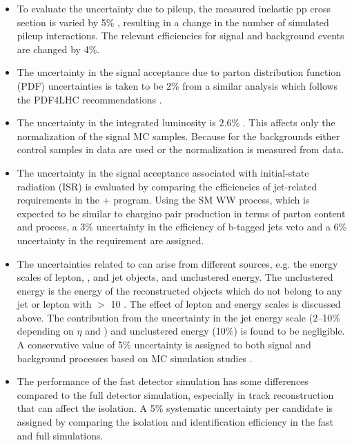 \begin{itemize}
\item To evaluate the uncertainty due to pileup, the measured inelastic pp cross section is
  varied by 5\% \cite{Antchev:2011vs}, resulting in a change in the number of simulated pileup interactions.
 The relevant efficiencies for signal and background events are changed by 4\%.

\item The uncertainty in the signal acceptance due to parton distribution function (PDF) uncertainties 
  is taken to be 2\% from a similar analysis \cite{Khachatryan:2014qwa} which follows the PDF4LHC recommendations \cite{pdf4lhc}.

\item The uncertainty in the integrated luminosity  is $2.6\%$ \cite{CMS-PAS-LUM-13-001}.  This affects only the
  normalization of the signal MC samples. Because for the backgrounds  either control samples in data are used or the normalization is measured from data.

\item The uncertainty in the signal acceptance associated with initial-state radiation (ISR)
is evaluated by comparing the efficiencies of jet-related requirements  
in the \MADGRAPH+ \PYTHIA program. 
Using the SM WW process, which
 is expected to be similar to chargino pair production in terms of parton content and process, a 3\% uncertainty in 
the efficiency of  b-tagged jets veto and a 6\% uncertainty in the \deltaphi requirement are assigned.

\item The uncertainties related to \MPT can arise from different sources, e.g.  the energy scales of lepton, \Tau, and jet 
objects, and unclustered energy.  The unclustered energy is the energy of the reconstructed objects which
 do not belong to any jet or lepton with \PT $>$ 10 \GeV. The effect of lepton and \Tau
 energy scales is discussed above. The contribution from the uncertainty in the jet energy scale (2--10\% depending on $\eta$  and \PT) and
 unclustered energy (10\%) is found to be negligible. A conservative value of 5\% uncertainty
 is assigned to both signal and background processes based on MC simulation studies \cite{Khachatryan:2015kxa, Khachatryan:2014qwa}.

\item The performance of the fast detector simulation has some differences compared to the full detector simulation, especially in
 track reconstruction \cite{Khachatryan:2015kxa} that can affect the \Tau isolation. A 5\% systematic uncertainty per
 \Tau candidate is assigned by comparing the \Tau isolation and identification efficiency in the fast
 and full simulations. 



\end{itemize}
